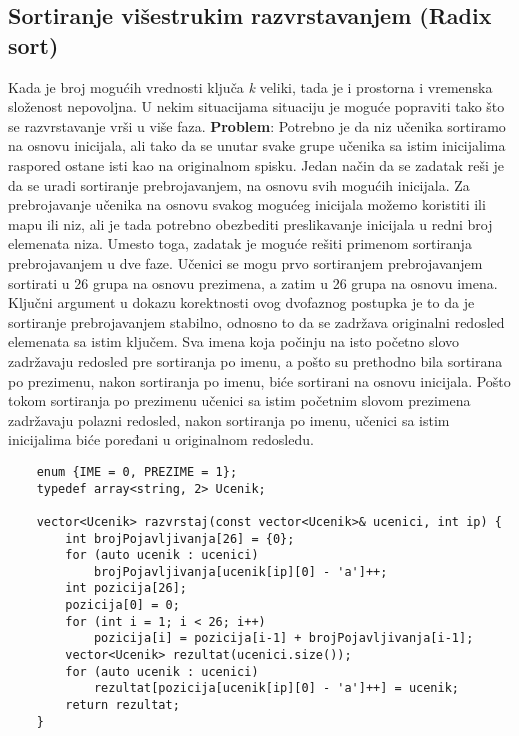 \documentclass{article}
\begin{document}
\subsection{Sortiranje višestrukim razvrstavanjem (Radix sort)}
Kada je broj mogućih vrednosti ključa \textit{k} veliki, tada je i prostorna i vremenska
složenost nepovoljna. U nekim situacijama situaciju je moguće popraviti tako
što se razvrstavanje vrši u više faza.
\vspace{0.1cm}\newline
\textbf{Problem}: Potrebno je da niz učenika sortiramo na osnovu inicijala, ali tako da
se unutar svake grupe učenika sa istim inicijalima raspored ostane isti kao na
originalnom spisku.
\newline
Jedan način da se zadatak reši je da se uradi sortiranje prebrojavanjem, na
osnovu svih mogućih inicijala. Za prebrojavanje učenika na osnovu svakog
mogućeg inicijala možemo koristiti ili mapu ili niz, ali je tada potrebno obezbediti
preslikavanje inicijala u redni broj elemenata niza.
Umesto toga, zadatak je moguće rešiti primenom sortiranja prebrojavanjem u
dve faze. Učenici se mogu prvo sortiranjem prebrojavanjem sortirati u 26 grupa
na osnovu prezimena, a zatim u 26 grupa na osnovu imena. 
Ključni argument u dokazu korektnosti ovog dvofaznog postupka je to da je
sortiranje prebrojavanjem stabilno, odnosno to da se zadržava originalni redosled elemenata sa istim ključem. Sva imena koja počinju na isto početno
slovo zadržavaju redosled pre sortiranja po imenu, a pošto su prethodno bila
sortirana po prezimenu, nakon sortiranja po imenu, biće sortirani na osnovu
inicijala. Pošto tokom sortiranja po prezimenu učenici sa istim početnim slovom
prezimena zadržavaju polazni redosled, nakon sortiranja po imenu, učenici sa
istim inicijalima biće poređani u originalnom redosledu.
\begin{lstlisting}
    enum {IME = 0, PREZIME = 1};
    typedef array<string, 2> Ucenik;
    
    vector<Ucenik> razvrstaj(const vector<Ucenik>& ucenici, int ip) {
        int brojPojavljivanja[26] = {0};
        for (auto ucenik : ucenici)
            brojPojavljivanja[ucenik[ip][0] - 'a']++;
        int pozicija[26];
        pozicija[0] = 0;
        for (int i = 1; i < 26; i++)
            pozicija[i] = pozicija[i-1] + brojPojavljivanja[i-1];
        vector<Ucenik> rezultat(ucenici.size());
        for (auto ucenik : ucenici)
            rezultat[pozicija[ucenik[ip][0] - 'a']++] = ucenik;
        return rezultat;
    }
\end{lstlisting}
\end{document}
